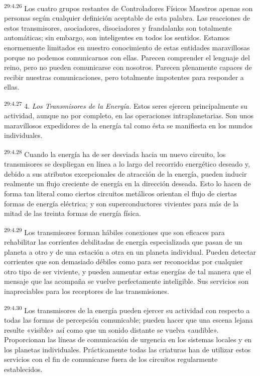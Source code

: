 \par
\textsuperscript{29:4.26} Los cuatro grupos restantes de Controladores Físicos Maestros apenas son personas según cualquier definición aceptable de esta palabra. Las reacciones de estos transmisores, asociadores, disociadores y frandalanks son totalmente automáticas; sin embargo, son inteligentes en todos los sentidos. Estamos enormemente limitados en nuestro conocimiento de estas entidades maravillosas porque no podemos comunicarnos con ellas. Parecen comprender el lenguaje del reino, pero no pueden comunicarse con nosotros. Parecen plenamente capaces de recibir nuestras comunicaciones, pero totalmente impotentes para responder a ellas.

\par
\textsuperscript{29:4.27} 4. \textit{Los Transmisores de la Energía.} Estos seres ejercen principalmente su actividad, aunque no por completo, en las operaciones intraplanetarias. Son unos maravillosos expedidores de la energía tal como ésta se manifiesta en los mundos individuales.

\par
\textsuperscript{29:4.28} Cuando la energía ha de ser desviada hacia un nuevo circuito, los transmisores se despliegan en línea a lo largo del recorrido energético deseado y, debido a sus atributos excepcionales de atracción de la energía, pueden inducir realmente un flujo creciente de energía en la dirección deseada. Esto lo hacen de forma tan literal como ciertos circuitos metálicos orientan el flujo de ciertas formas de energía eléctrica; y son superconductores vivientes para más de la mitad de las treinta formas de energía física.

\par
\textsuperscript{29:4.29} Los transmisores forman hábiles conexiones que son eficaces para rehabilitar las corrientes debilitadas de energía especializada que pasan de un planeta a otro y de una estación a otra en un planeta individual. Pueden detectar corrientes que son demasiado débiles como para ser reconocidas por cualquier otro tipo de ser viviente, y pueden aumentar estas energías de tal manera que el mensaje que las acompaña se vuelve perfectamente inteligible. Sus servicios son inapreciables para los receptores de las transmisiones.

\par
\textsuperscript{29:4.30} Los transmisores de la energía pueden ejercer su actividad con respecto a todas las formas de percepción comunicable; pueden hacer que una escena lejana resulte «visible» así como que un sonido distante se vuelva «audible». Proporcionan las líneas de comunicación de urgencia en los sistemas locales y en los planetas individuales. Prácticamente todas las criaturas han de utilizar estos servicios con el fin de comunicarse fuera de los circuitos regularmente establecidos.

